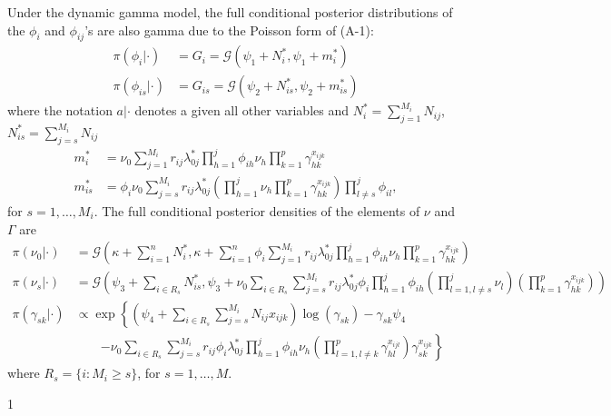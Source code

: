 \documentclass[10pt, letterpaper]{article}
\newcommand{\Gdist}{\mathcal{G}} %
\begin{document}
Under the dynamic gamma model, the full conditional posterior distributions of the $\phi_i$ and $\phi_{ij}$'s are also gamma due to the Poisson form of (A-1):
\begin{align} 
\pi(\phi_i | \cdot) &= G_i = \Gdist(\psi_1 + N_i^*, \psi_1 + m_i^*) \label{eq:A2} \tag{A-2} \\
\pi(\phi_{is} | \cdot) &= G_{is} = \Gdist(\psi_2 + N_{is}^*, \psi_2 + m_{is}^*) \label{eq:A3} \tag{A-3} 
\end{align}
where the notation $a|\cdot$ denotes a given all other variables and $N_i^* = \sum_{j=1}^{M_i} N_{ij}$, $N_{is}^* = \sum_{j=s}^{M_i} N_{ij}$
\begin{align*}
m_i^* &= \nu_0 \sum_{j=1}^{M_i} r_{ij} \lambda_{0j}^* \prod_{h=1}^j \phi_{ih} \nu_h \prod_{k=1}^p \gamma_{hk}^{x_{ijk}} \\
m_{is}^* &= \phi_i \nu_0 \sum_{j=s}^{M_i} r_{ij} \lambda_{0j}^* \left( \prod_{h=1}^j \nu_h \prod_{k=1}^p \gamma_{hk}^{x_{ijk}} \right) \prod_{l \ne s}^j \phi_{il}, 
\end{align*}
for $s=1, \dots, M_i$. The full conditional posterior densities of the elements of $\nu$ and $\Gamma$ are
\begin{align} 
\pi(\nu_0 | \cdot) &= \Gdist \left( \kappa + \sum_{i=1}^n N_i^*, \kappa + \sum_{i=1}^n \phi_i \sum_{j=1}^{M_i} r_{ij} \lambda_{0j}^* \prod_{h=1}^j \phi_{ih} \nu_h \prod_{k=1}^p \gamma_{hk}^{x_{ijk}} \right) \label{eq:A4} \tag{A-4} \\
\pi(\nu_s | \cdot) &= \Gdist \left( \psi_3 + \sum_{i \in R_s} N_{is}^*, \psi_3 + \nu_0 \sum_{i \in R_s} \sum_{j=s}^{M_i} r_{ij} \lambda_{0j}^* \phi_i \prod_{h=1}^j \phi_{ih} \left( \prod_{l=1, l \ne s}^j \nu_l \right) \left( \prod_{k=1}^p \gamma_{hk}^{x_{ijk}} \right) \right) \label{eq:A5} \tag{A-5} \\
\pi(\gamma_{sk} | \cdot) &\propto \exp \left\{ \left( \psi_4 + \sum_{i \in R_s} \sum_{j=s}^{M_i} N_{ij} x_{ijk} \right) \log(\gamma_{sk}) - \gamma_{sk} \psi_4 \right. \nonumber \\
& \qquad \left. - \nu_0 \sum_{i \in R_s} \sum_{j=s}^{M_i} r_{ij} \phi_i \lambda_{0j}^* \prod_{h=1}^j \phi_{ih} \nu_h \left( \prod_{l=1, l \ne k}^p \gamma_{hl}^{x_{ijl}} \right) \gamma_{sk}^{x_{ijk}} \right\} \label{eq:A6} \tag{A-6}
\end{align}
where $R_s = \{ i : M_i \ge s \}$, for $s=1, \dots, M$.

\vfill
\centerline{1}
\clearpage %
\end{document}
